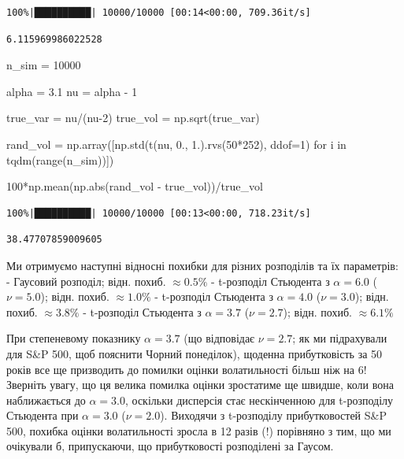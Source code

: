\documentclass[
  letterpaper,
]{report}
\newenvironment{Shaded}{\begin{snugshade}}{\end{snugshade}}
\newcommand{\BuiltInTok}[1]{\textcolor[rgb]{0.00,0.23,0.31}{#1}}
\newcommand{\ControlFlowTok}[1]{\textcolor[rgb]{0.00,0.23,0.31}{#1}}
\newcommand{\DecValTok}[1]{\textcolor[rgb]{0.68,0.00,0.00}{#1}}
\newcommand{\FloatTok}[1]{\textcolor[rgb]{0.68,0.00,0.00}{#1}}
\newcommand{\KeywordTok}[1]{\textcolor[rgb]{0.00,0.23,0.31}{#1}}
\newcommand{\NormalTok}[1]{\textcolor[rgb]{0.00,0.23,0.31}{#1}}
\newcommand{\OperatorTok}[1]{\textcolor[rgb]{0.37,0.37,0.37}{#1}}
\begin{document}
\begin{verbatim}
100%|██████████| 10000/10000 [00:14<00:00, 709.36it/s]
\end{verbatim}

\begin{verbatim}
6.115969986022528
\end{verbatim}

\begin{Shaded}
\begin{Highlighting}[]
\NormalTok{n\_sim }\OperatorTok{=} \DecValTok{10000}

\NormalTok{alpha }\OperatorTok{=} \FloatTok{3.1}
\NormalTok{nu }\OperatorTok{=}\NormalTok{ alpha }\OperatorTok{{-}} \DecValTok{1}

\NormalTok{true\_var }\OperatorTok{=}\NormalTok{ nu}\OperatorTok{/}\NormalTok{(nu}\OperatorTok{{-}}\DecValTok{2}\NormalTok{)}
\NormalTok{true\_vol }\OperatorTok{=}\NormalTok{ np.sqrt(true\_var)}

\NormalTok{rand\_vol }\OperatorTok{=}\NormalTok{ np.array([np.std(t(nu, }\FloatTok{0.}\NormalTok{, }\FloatTok{1.}\NormalTok{).rvs(}\DecValTok{50}\OperatorTok{*}\DecValTok{252}\NormalTok{), ddof}\OperatorTok{=}\DecValTok{1}\NormalTok{) }\ControlFlowTok{for}\NormalTok{ i }\KeywordTok{in}\NormalTok{ tqdm(}\BuiltInTok{range}\NormalTok{(n\_sim))])}

\DecValTok{100}\OperatorTok{*}\NormalTok{np.mean(np.}\BuiltInTok{abs}\NormalTok{(rand\_vol }\OperatorTok{{-}}\NormalTok{ true\_vol))}\OperatorTok{/}\NormalTok{true\_vol}
\end{Highlighting}
\end{Shaded}

\begin{verbatim}
100%|██████████| 10000/10000 [00:13<00:00, 718.23it/s]
\end{verbatim}

\begin{verbatim}
38.47707859009605
\end{verbatim}

Ми отримуємо наступні відносні похибки для різних розподілів та їх
параметрів: - Гаусовий розподіл; відн. похиб. \(\approx 0.5\%\) -
t-розподіл Стьюдента з \(\alpha=6.0\) (\(\nu=5.0\)); відн. похиб.
\(\approx 1.0\%\) - t-розподіл Стьюдента з \(\alpha=4.0\) (\(\nu=3.0\));
відн. похиб. \(\approx 3.8\%\) - t-розподіл Стьюдента з \(\alpha=3.7\)
(\(\nu=2.7\)); відн. похиб. \(\approx 6.1\%\)

При степеневому показнику \(\alpha= 3.7\) (що відповідає \(\nu = 2.7\);
як ми підрахували для S\&P 500, щоб пояснити Чорний понеділок), щоденна
прибутковість за 50 років все ще призводить до помилки оцінки
волатильності більш ніж на \(6%
\)! Зверніть увагу, що ця велика помилка оцінки зростатиме ще швидше,
коли вона наближається до \(\alpha = 3.0\), оскільки дисперсія стає
нескінченною для t-розподілу Стьюдента при \(\alpha = 3.0\)
(\(\nu = 2.0\)). Виходячи з t-розподілу прибутковостей S\&P 500, похибка
оцінки волатильності зросла в 12 разів (!) порівняно з тим, що ми
очікували б, припускаючи, що прибутковості розподілені за Гаусом.
\end{document}

